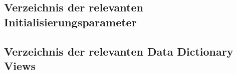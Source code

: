       \subsection{Verzeichnis der relevanten Initialisierungsparameter}
        \begin{literaturinternet}
          \item \cite{REFRN10029}
          \item \cite{REFRN10030}
          \item \cite{REFRN10268}
          \item \cite{REFRN10295}
          \item \cite{REFRN10061}
          \item \cite{REFRN10089}
          \item \cite{REFRN10086}
        \end{literaturinternet}
      \subsection{Verzeichnis der relevanten Data Dictionary Views}
        \begin{literaturinternet}
          \item \cite{REFRN30047}
          \item \cite{REFRN30048}
          \item \cite{REFRN30049}
          \item \cite{sthref3281}
          \item \cite{REFRN30052}
          \item \cite{REFRN30196}
          \item \cite{sthref3785}
        \end{literaturinternet}
\clearpage
